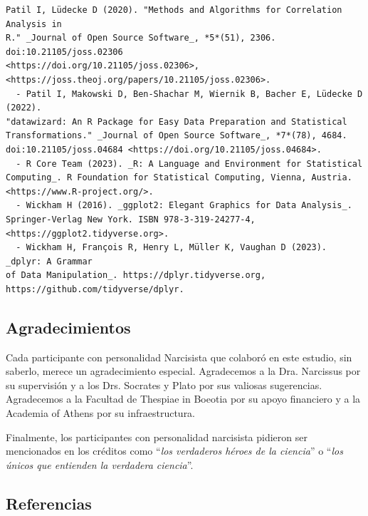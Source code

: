 \documentclass[
  10pt]{article}
\begin{document}
\begin{tcolorbox}[enhanced jigsaw, leftrule=.75mm, colframe=quarto-callout-color-frame, breakable, opacityback=0, bottomrule=.15mm, left=2mm, rightrule=.15mm, arc=.35mm, toprule=.15mm, colback=white]
\begin{verbatim}
Patil I, Lüdecke D (2020). "Methods and Algorithms for Correlation Analysis in
R." _Journal of Open Source Software_, *5*(51), 2306. doi:10.21105/joss.02306
<https://doi.org/10.21105/joss.02306>,
<https://joss.theoj.org/papers/10.21105/joss.02306>.
  - Patil I, Makowski D, Ben-Shachar M, Wiernik B, Bacher E, Lüdecke D (2022).
"datawizard: An R Package for Easy Data Preparation and Statistical
Transformations." _Journal of Open Source Software_, *7*(78), 4684.
doi:10.21105/joss.04684 <https://doi.org/10.21105/joss.04684>.
  - R Core Team (2023). _R: A Language and Environment for Statistical
Computing_. R Foundation for Statistical Computing, Vienna, Austria.
<https://www.R-project.org/>.
  - Wickham H (2016). _ggplot2: Elegant Graphics for Data Analysis_.
Springer-Verlag New York. ISBN 978-3-319-24277-4,
<https://ggplot2.tidyverse.org>.
  - Wickham H, François R, Henry L, Müller K, Vaughan D (2023). _dplyr: A Grammar
of Data Manipulation_. https://dplyr.tidyverse.org,
https://github.com/tidyverse/dplyr.
\end{verbatim}

\end{tcolorbox}

\subsection{Agradecimientos}\label{agradecimientos}

Cada participante con personalidad Narcisista que colaboró en este
estudio, sin saberlo, merece un agradecimiento especial. Agradecemos a
la Dra. Narcissus por su supervisión y a los Drs. Socrates y Plato por
sus valiosas sugerencias. Agradecemos a la Facultad de Thespiae in
Boeotia por su apoyo financiero y a la Academia of Athens por su
infraestructura.

Finalmente, los participantes con personalidad narcisista pidieron ser
mencionados en los créditos como ``\emph{los verdaderos héroes de la
ciencia}'' o ``\emph{los únicos que entienden la verdadera ciencia}''.

\subsection*{Referencias}\label{referencias}
\end{document}
